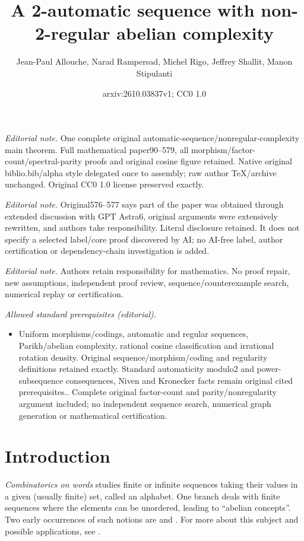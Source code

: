 \documentclass[12pt]{article}
\title{A 2-automatic sequence with non-2-regular abelian complexity}
\author{Jean-Paul Allouche, Narad Rampersad, Michel Rigo, Jeffrey Shallit, Manon Stipulanti}
\date{arxiv:2610.03837v1; CC0 1.0}
\theoremstyle{plain}
\theoremstyle{definition}
\theoremstyle{remark}
\numberwithin{equation}{section}
\begin{document}
\maketitle
\noindent\textit{Editorial note.} One complete original automatic-sequence/nonregular-complexity main theorem. Full mathematical paper90--579, all morphism/factor-count/spectral-parity proofs and original cosine figure retained. Native original biblio.bib/alpha style delegated once to assembly; raw author TeX/archive unchanged. Original CC0 1.0 license preserved exactly.\par\medskip
\noindent\textit{Editorial note.} Original576--577 says part of the paper was obtained through extended discussion with GPT Astra6, original arguments were extensively rewritten, and authors take responsibility. Literal disclosure retained. It does not specify a selected label/core proof discovered by AI; no AI-free label, author certification or dependency-chain investigation is added.\par\medskip
\noindent\textit{Editorial note.} Authors retain responsibility for mathematics. No proof repair, new assumptions, independent proof review, sequence/counterexample search, numerical replay or certification.\par\medskip
\noindent\textit{Allowed standard prerequisites (editorial).}\begin{itemize}
\item Uniform morphisms/codings, automatic and regular sequences, Parikh/abelian complexity, rational cosine classification and irrational rotation density. Original sequence/morphism/coding and regularity definitions retained exactly. Standard automaticity modulo2 and power-subsequence consequences, Niven and Kronecker facts remain original cited prerequisites.. Complete original factor-count and parity/nonregularity argument included; no independent sequence search, numerical graph generation or mathematical certification.
\end{itemize}\medskip
\section{Introduction}

{\it Combinatorics on words} studies finite or infinite sequences 
taking their values in a given (usually finite) set, called an alphabet. One branch
deals with finite sequences where the elements can be unordered,
leading to ``abelian concepts''. Two early occurrences of such
notions are \cite[p.~240]{Erdos} and \cite{Parikh}. For 
more about this subject and possible applications, see \cite{CC,Fici&Puzynina:2025}.
\end{document}
